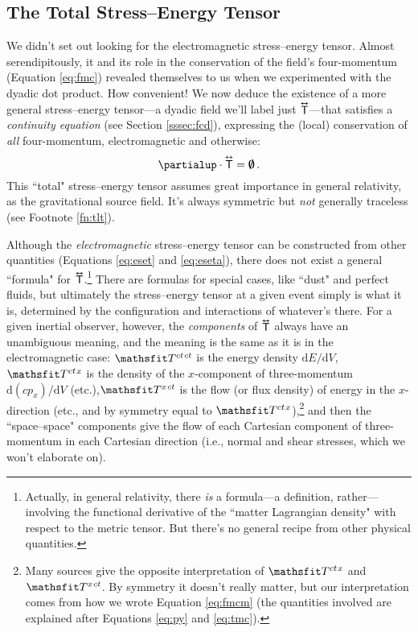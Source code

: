 \documentclass[12pt]{article}
\newcommand{\dd}[1]{\mathrm{d}#1}
\newcommand{\tightoverset}[2]{%
  \mathop{#2}\limits^{\vbox to -.5ex{\kern-0.75ex\hbox{$#1$}\vss}}}
\newcommand{\inlinedy}[1]{\tightoverset{\text{\tiny$\bm\leftrightarrow$}}{#1}}
\newcommand{\capdy}[1]{ \overset{ \text{\tiny$\bm\leftrightarrow$} }{\vphantom{\text{\small{A}}}\smash{#1}} }
\begin{document}
\subsection{The Total Stress--Energy Tensor}\label{sssec:tset}

We didn't set out looking for the electromagnetic stress--energy tensor. Almost serendipitously, it and its role in the conservation of the field's four-momentum (Equation \ref{eq:fmc}) revealed themselves to us when we experimented with the dyadic dot product. How convenient! We now deduce the existence of a more general stress--energy tensor---a dyadic field we'll label just ${\inlinedy{\mathsf{T}}}$---that satisfies a \emph{continuity equation} (see Section \ref{sssec:fcd}), expressing the (local) conservation of \emph{all} four-momentum, electromagnetic and otherwise:
\begin{equation}\label{eq:set}
\partialup \cdot \capdy{\mathsf{T}} = \textrm{\mbox{\boldmath $\emptyset$}} \, .
\end{equation}
This ``total" stress--energy tensor assumes great importance in general relativity, as the gravitational source field. It's always symmetric but \emph{not} generally traceless (see Footnote \ref{fn:tlt}).

Although the \emph{electromagnetic} stress--energy tensor can be constructed from other quantities (Equations \ref{eq:eset} and \ref{eq:eseta}), there does not exist a general ``formula" for ${\inlinedy{\mathsf{T}}}$.\footnote{\label{fn:setgr}Actually, in general relativity, there \emph{is} a formula---a definition, rather---involving the functional derivative of the ``matter Lagrangian density" with respect to the metric tensor. But there's no general recipe from other physical quantities.} There are formulas for special cases, like ``dust" and perfect fluids, but ultimately the stress--energy tensor at a given event simply is what it is, determined by the configuration and interactions of whatever's there. For a given inertial observer, however, the \emph{components} of ${\inlinedy{\mathsf{T}}}$ always have an unambiguous meaning, and the meaning is the same as it is in the electromagnetic case: $\mathsfit T^{ct \mkern1.5mu ct}$ is the energy density $\dd E / \dd V$, $\mathsfit T^{ct \mkern1.5mu x}$ is the density of the $x$-component of three-momentum $\dd (c p_x) / \dd V$ (etc.),$\mathsfit T^{x \mkern1.5mu ct}$ is the flow (or flux density) of energy in the $x$-direction (etc., and by symmetry equal to $\mathsfit T^{ct \mkern1.5mu x}$),\footnote{Many sources give the opposite interpretation of $\mathsfit T^{ct \mkern1.5mu x}$ and $\mathsfit T^{x \mkern1.5mu ct}$. By symmetry it doesn't really matter, but our interpretation comes from how we wrote Equation \ref{eq:fmcm} (the quantities involved are explained after Equations \ref{eq:py} and \ref{eq:tmc}).} and then the ``space--space" components give the flow of each Cartesian component of three-momentum in each Cartesian direction (i.e., normal and shear stresses, which we won't elaborate on).
\end{document}
